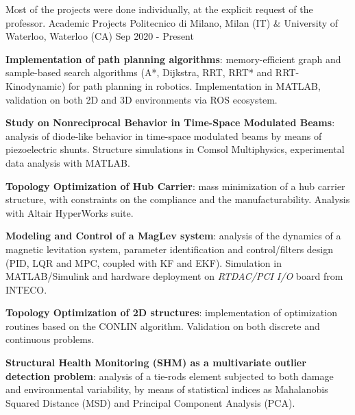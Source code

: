 

\begin{cventries}

    \cventry
    {Most of the projects were done individually, at the explicit request of the professor.}
    {Academic Projects}
    {Politecnico di Milano, Milan (IT) \& University of Waterloo, Waterloo (CA)}
    {Sep 2020 - Present}
    {
        \begin{cvitems}
            \item {\textbf{Implementation of path planning algorithms}: memory-efficient graph and sample-based search algorithms (A*, Dijkstra, RRT, RRT* and RRT-Kinodynamic) for path planning in robotics. Implementation in MATLAB, validation on both 2D and 3D environments via ROS ecosystem.}
            \item {\textbf{Study on Nonreciprocal Behavior in Time-Space Modulated Beams}: analysis of diode-like behavior in time-space modulated beams by means of piezoelectric shunts. Structure simulations in Comsol Multiphysics, experimental data analysis with MATLAB.}
            \item {\textbf{Topology Optimization of Hub Carrier}: mass minimization of a hub carrier structure, with constraints on the compliance and the manufacturability. Analysis with Altair HyperWorks suite.}
            \item {\textbf{Modeling and Control of a MagLev system}: analysis of the dynamics of a magnetic levitation system, parameter identification and control/filters design (PID, LQR and MPC, coupled with KF and EKF). Simulation in MATLAB/Simulink and hardware deployment on \textit{RTDAC/PCI I/O} board from INTECO.}
            \item {\textbf{Topology Optimization of 2D structures}: implementation of optimization routines based on the CONLIN algorithm. Validation on both discrete and continuous problems.}
            \item {\textbf{Structural Health Monitoring (SHM) as a multivariate outlier detection problem}: analysis of a tie-rods element subjected to both damage and environmental variability, by means of statistical indices as Mahalanobis Squared Distance (MSD) and Principal Component Analysis (PCA).}

\end{cvitems}}
\end{cventries}
